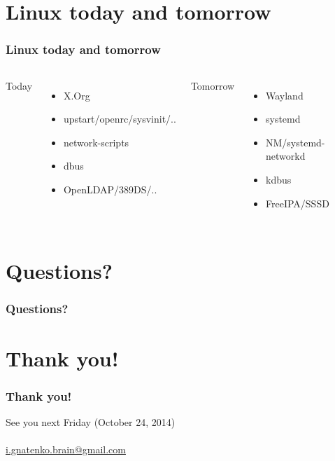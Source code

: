\documentclass{beamer}
\begin{document}
\section{Linux today and tomorrow}
\begin{frame}
\frametitle<presentation>{Linux today and tomorrow}
\begin{columns}[c]
Today
\begin{itemize}
  \item X.Org
  \item upstart/openrc/sysvinit/..
  \item network-scripts 
  \item dbus
  \item OpenLDAP/389DS/..
\end{itemize}
Tomorrow
\begin{itemize}
  \item Wayland
  \item systemd
  \item NM/systemd-networkd
  \item kdbus
  \item FreeIPA/SSSD
\end{itemize}
\end{columns}
\end{frame}

\section*{Questions?}
\begin{frame}
\frametitle<presentation>{Questions?}
\end{frame}

\section*{Thank you!}
\begin{frame}
\frametitle<presentation>{Thank you!}

\begin{center}
See you next Friday (October 24, 2014)\\
\bigskip
\MyAuthor\\
\href{mailto:i.gnatenko.brain@gmail.com}{i.gnatenko.brain@gmail.com}
\end{center}
\end{frame}
\end{document}
